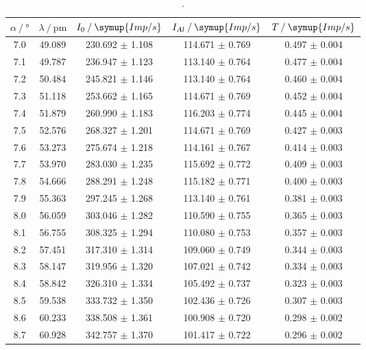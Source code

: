 \begin{table}[H]
  \centering
  \caption{.}
  \begin{tabular}{ccccc}
    \toprule
    {$\alpha \mathbin{/} \unit{\degree}$} &
    {$\lambda \mathbin{/} \unit{\pico\meter}$} &
    {$I_0 \mathbin{/} \symup{Imp/s}$} &
    {$I_{Al} \mathbin{/} \symup{Imp/s}$} &
    {$T \mathbin{/} \symup{Imp/s}$} \\
    \midrule
    7.0 & 49.089 & 230.692 $\pm$ 1.108 & 114.671 $\pm$ 0.769 & 0.497 $\pm$ 0.004 \\
    7.1 & 49.787 & 236.947 $\pm$ 1.123 & 113.140 $\pm$ 0.764 & 0.477 $\pm$ 0.004 \\
    7.2 & 50.484 & 245.821 $\pm$ 1.146 & 113.140 $\pm$ 0.764 & 0.460 $\pm$ 0.004 \\
    7.3 & 51.118 & 253.662 $\pm$ 1.165 & 114.671 $\pm$ 0.769 & 0.452 $\pm$ 0.004 \\
    7.4 & 51.879 & 260.990 $\pm$ 1.183 & 116.203 $\pm$ 0.774 & 0.445 $\pm$ 0.004 \\
    7.5 & 52.576 & 268.327 $\pm$ 1.201 & 114.671 $\pm$ 0.769 & 0.427 $\pm$ 0.003 \\
    7.6 & 53.273 & 275.674 $\pm$ 1.218 & 114.161 $\pm$ 0.767 & 0.414 $\pm$ 0.003 \\
    7.7 & 53.970 & 283.030 $\pm$ 1.235 & 115.692 $\pm$ 0.772 & 0.409 $\pm$ 0.003 \\
    7.8 & 54.666 & 288.291 $\pm$ 1.248 & 115.182 $\pm$ 0.771 & 0.400 $\pm$ 0.003 \\
    7.9 & 55.363 & 297.245 $\pm$ 1.268 & 113.140 $\pm$ 0.761 & 0.381 $\pm$ 0.003 \\
    8.0 & 56.059 & 303.046 $\pm$ 1.282 & 110.590 $\pm$ 0.755 & 0.365 $\pm$ 0.003 \\
    8.1 & 56.755 & 308.325 $\pm$ 1.294 & 110.080 $\pm$ 0.753 & 0.357 $\pm$ 0.003 \\
    8.2 & 57.451 & 317.310 $\pm$ 1.314 & 109.060 $\pm$ 0.749 & 0.344 $\pm$ 0.003 \\
    8.3 & 58.147 & 319.956 $\pm$ 1.320 & 107.021 $\pm$ 0.742 & 0.334 $\pm$ 0.003 \\
    8.4 & 58.842 & 326.310 $\pm$ 1.334 & 105.492 $\pm$ 0.737 & 0.323 $\pm$ 0.003 \\
    8.5 & 59.538 & 333.732 $\pm$ 1.350 & 102.436 $\pm$ 0.726 & 0.307 $\pm$ 0.003 \\
    8.6 & 60.233 & 338.508 $\pm$ 1.361 & 100.908 $\pm$ 0.720 & 0.298 $\pm$ 0.002 \\
    8.7 & 60.928 & 342.757 $\pm$ 1.370 & 101.417 $\pm$ 0.722 & 0.296 $\pm$ 0.002 \\

\end{tabular}
\end{table}
